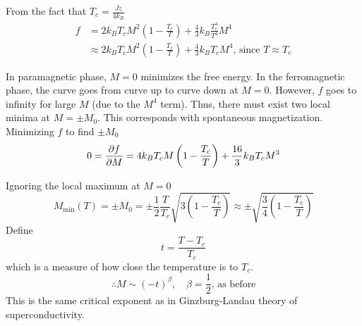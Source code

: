 \documentclass[12pt,a4paper,titlepage]{article}
\newcommand{\trm}[1]{\textrm{#1}} %
\newcommand{\ul}[1]{\underline{\smash{#1}}} %
\begin{document}
From the fact that $T_{c}=\frac{Jz}{4k_{B}}$
\begin{equation}
\begin{aligned}
f&=2k_{B}T_{c}M^{2}\left(1-\frac{T_{c}}{T}\right)+\frac{4}{3}k_{B}\frac{T_{c}^{4}}{T^{4}}M^{4}\\
&\approx2k_{B}T_{c}M^{2}\left(1-\frac{T_{c}}{T}\right)+\frac{4}{3}k_{B}T_{c}M^{4}\trm{, since $T\approx T_{c}$}
\end{aligned}
\end{equation}
\begin{center}
\end{center}
In paramagnetic phase, $M=0$ minimizes the free energy. In the ferromagnetic phase, the curve goes from curve up to curve down at $M=0$. However, $f$ goes to infinity for large $M$ (due to the $M^{4}$ term). Thus, there must exist two local minima at $M=\pm M_{0}$. This corresponds with spontaneous magnetization.\\

Minimizing $f$ to find $\pm M_{0}$
\begin{equation}
0=\pdv{f}{M}=4k_{B}T_{c}M\left(1-\frac{T_{c}}{T}\right)+\frac{16}{3}k_{B}T_{c}M^{3}
\end{equation}

Ignoring the local maximum at $M=0$
\begin{equation}
M_{\trm{min}}(T)=\pm M_{0}=\pm\frac{1}{2}\frac{T}{T_{c}}\sqrt{3\left(1-\frac{T_{c}}{T}\right)}\approx\pm\sqrt{\frac{3}{4}\left(1-\frac{T_{c}}{T}\right)}
\end{equation}
Define \ul{reduced temperature}
\begin{equation}
t=\frac{T-T_{c}}{T_{c}}
\end{equation}
which is a measure of how close the temperature is to $T_{c}$.
\begin{equation}
\therefore M\sim(-t)^{\beta},\quad\beta=\frac{1}{2}\trm{, as before}
\end{equation}
This is the same critical exponent as in Ginzburg-Landau theory of superconductivity.
\end{document}
